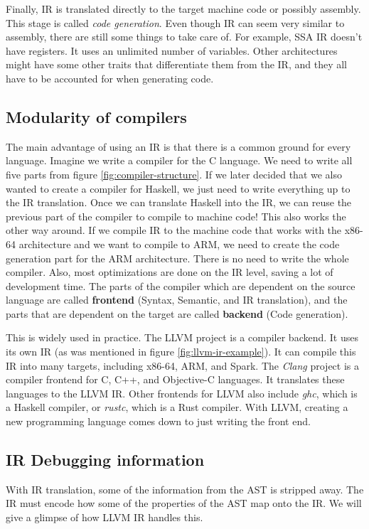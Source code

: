 Finally, IR is translated directly to the target machine code or possibly
assembly. This stage is called \textit{code generation}. Even though IR can
seem very similar to assembly, there are still some things to take care of. For
example, SSA IR doesn't have registers. It uses an unlimited number of
variables. Other architectures might have some other traits that differentiate
them from the IR, and they all have to be accounted for when generating code.

\subsection{Modularity of compilers}
The main advantage of using an IR is that there is a common ground for every
language. Imagine we write a compiler for the C language. We need to write all
five parts from figure \ref{fig:compiler-structure}. If we later decided that
we also wanted to create a compiler for Haskell, we just need to write
everything up to the IR translation. Once we can translate Haskell into the IR,
we can reuse the previous part of the compiler to compile to machine code! This
also works the other way around. If we compile IR to the machine code that
works with the x86-64 architecture and we want to compile to ARM, we need to
create the code generation part for the ARM architecture. There is no need to
write the whole compiler. Also, most optimizations are done on the IR level,
saving a lot of development time. The parts of the compiler which are dependent
on the source language are called \textbf{frontend} (Syntax, Semantic, and IR
translation), and the parts that are dependent on the target are called
\textbf{backend} (Code generation).

This is widely used in practice. The LLVM \cite{llvm} project is a compiler
backend. It uses its own IR (as was mentioned in figure
\ref{fig:llvm-ir-example}). It can compile this IR into many targets, including
x86-64, ARM, and Spark. The \textit{Clang} project is a compiler frontend for
C, C++, and Objective-C languages. It translates these languages to the LLVM
IR. Other frontends for LLVM also include \textit{ghc}, which is a Haskell
compiler, or \textit{rustc}, which is a Rust compiler. With LLVM, creating a
new programming language comes down to just writing the front end.

\subsection{IR Debugging information}
With IR translation, some of the information from the AST is stripped away. The
IR must encode how some of the properties of the AST map onto the IR. We will
give a glimpse of how LLVM IR handles this.

